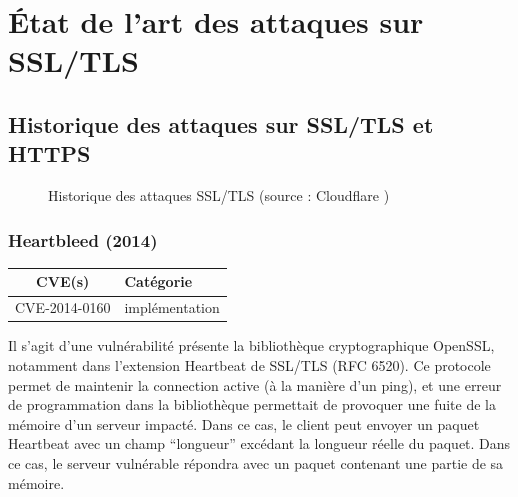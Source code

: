 \chapter{État de l'art des attaques sur SSL/TLS}

\section{Historique des attaques sur SSL/TLS et HTTPS}

\begin{figure}[H]
  \caption{Historique des attaques SSL/TLS (source : Cloudflare \cite{cloudflare})}
\end{figure}




\subsection{Heartbleed (2014)}

\begin{tabularx}{0.96\textwidth}{|c|X|}
  \hline
  \textbf{CVE(s)} & \textbf{Catégorie} \\
  \hline
  CVE-2014-0160 & implémentation \\
  \hline
\end{tabularx}

\vspace{1em}

Il s'agit d'une vulnérabilité présente la bibliothèque cryptographique OpenSSL, notamment dans l'extension Heartbeat de SSL/TLS (RFC 6520). Ce protocole permet de maintenir la connection active (à la manière d'un ping), et une erreur de programmation dans la bibliothèque permettait de provoquer une fuite de la mémoire d'un serveur impacté. Dans ce cas, le client peut envoyer un paquet Heartbeat avec un champ ``longueur'' excédant la longueur réelle du paquet. Dans ce cas, le serveur vulnérable répondra avec un paquet contenant une partie de sa mémoire.


